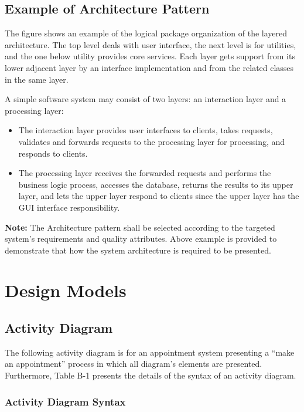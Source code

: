 \documentclass[12pt,a4paper]{report}
\begin{document}
\section{Example of Architecture Pattern}

The figure shows an example of the logical package organization of the layered architecture. The top level deals with user interface, the next level is for utilities, and the one below utility provides core services. Each layer gets support from its lower adjacent layer by an interface implementation and from the related classes in the same layer.

A simple software system may consist of two layers: an interaction layer and a processing layer:

\begin{itemize}
    \item The interaction layer provides user interfaces to clients, takes requests, validates and forwards requests to the processing layer for processing, and responds to clients.
    \item The processing layer receives the forwarded requests and performs the business logic process, accesses the database, returns the results to its upper layer, and lets the upper layer respond to clients since the upper layer has the GUI interface responsibility.
\end{itemize}

\textbf{Note:} The Architecture pattern shall be selected according to the targeted system's requirements and quality attributes. Above example is provided to demonstrate that how the system architecture is required to be presented.

\chapter{Design Models}

\section{Activity Diagram}

The following activity diagram is for an appointment system presenting a ``make an appointment'' process in which all diagram's elements are presented. Furthermore, Table B-1 presents the details of the syntax of an activity diagram.

\subsection*{Activity Diagram Syntax}
\end{document}
